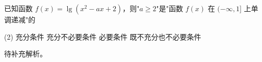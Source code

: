\begin{choice}[topic={对数函数的定义域与单调性}]
已知函数 $f(x) = \lg(x^2 - ax + 2)$，则"$a \ge 2$"是"函数 $f(x)$ 在 $(-\infty, 1]$ 上单调递减"的
\begin{tasks}(2)
	\task 充分条件
	\task 充分不必要条件
	\task 必要条件
	\task 既不充分也不必要条件
\end{tasks}
\end{choice}
\begin{choice-sol}
待补充解析。
\end{choice-sol}
